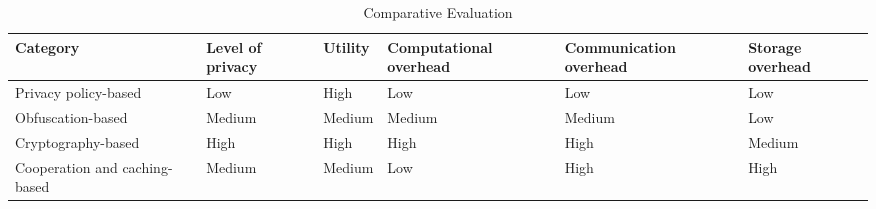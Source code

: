 \documentclass{opticajnl}
\begin{document}
\begin{table}[H]
\begin{tabular}{|p{2cm}|p{2cm}|p{2cm}|p{2cm}|p{2cm}|p{2cm}|} 
    \hline
    Category&Level of privacy&Utility&Computational overhead&Communication overhead&Storage overhead  \\
    \hline
    Privacy policy-based&Low&High&Low&Low&Low \\
    \hline
    Obfuscation-based&Medium&Medium&Medium&Medium&Low \\
    \hline
    Cryptography-based&High&High&High&High&Medium \\
    \hline
    Cooperation and caching-based&Medium&Medium&Low&High&High \\
    \hline
\end{tabular}
\caption{Comparative Evaluation}
\label{tab1}
\end{table}
\end{document}
